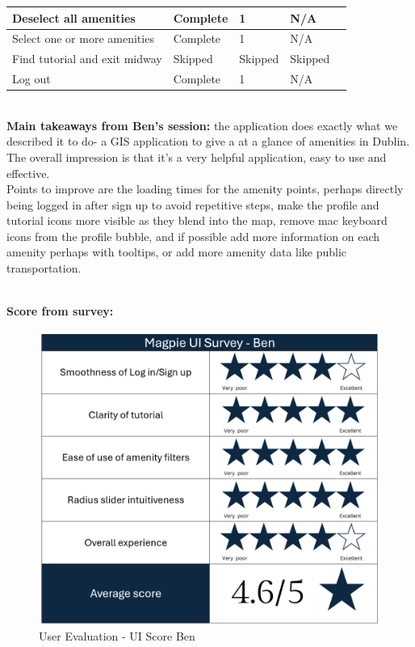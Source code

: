 \begin{table}[h!]
\begin{tabular}{|p{}|p{}|p{}|p{}|p{}|}
        \hline
        Deselect all amenities        & Complete        & 1                   & N/A             \\
        \hline
        Select one or more amenities  & Complete        & 1                   & N/A             \\
        \hline
        Find tutorial and exit midway & Skipped         & Skipped             & Skipped         \\
        \hline
        Log out                       & Complete        & 1                   & N/A             \\
        \hline
    \end{tabular}
\end{table}\\
\noindent\textbf{Main takeaways from Ben's session: }the application does exactly what we described it to do- a GIS application to give a at a glance of amenities in Dublin. The overall impression is that it's a very helpful application, easy to use and effective.\\
Points to improve are the loading times for the amenity points, perhaps  directly being logged in after sign up to avoid repetitive steps, make the profile and tutorial icons more visible as they blend into the map, remove mac keyboard icons from the profile bubble, and if possible add more information on each amenity perhaps with tooltips, or add more amenity data like public transportation.\\ \\

\newpage{}

\textbf{Score from survey: }
\begin{figure}[h!]
    \centering
    \includegraphics[width=\textwidth]{images/survey-ben.png}
    \caption{User Evaluation - UI Score Ben}
\end{figure}

